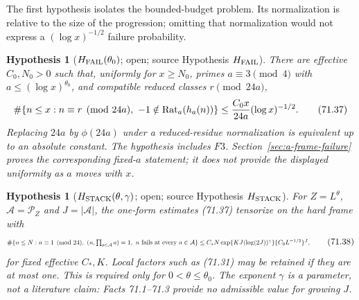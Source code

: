 \documentclass[10pt,reqno]{amsart}
\newtheorem{hypothesis}[theorem]{Hypothesis}
\theoremstyle{definition}
\newcommand{\1}{\mathbf 1}
\begin{document}
The first hypothesis isolates the bounded-budget problem.  Its normalization
is relative to the size of the progression; omitting that normalization
would not express a $(\log x)^{-1/2}$ failure probability.

\begin{hypothesis}[$H_{\rm FAIL}(\theta_0)$; open; source Hypothesis $H_{\rm FAIL}$]\label{hyp:H-FAIL}  There are effective
$C_0,N_0>0$ such that, uniformly for $x\geq N_0$, primes
$a\equiv3\pmod4$ with $a\leq(\log x)^{\theta_0}$, and compatible
reduced classes $r\pmod {24a}$,
\begin{equation}
 \#\{n\leq x:n\equiv r\pmod {24a},\
       -1\notin\operatorname {Rat}_a(h_a(n))\}
 \leq {C_0x\over24a}(\log x)^{-1/2}.                     \tag{71.37}
\end{equation}
Replacing $24a$ by $\phi(24a)$ under a reduced-residue
normalization is equivalent up to an absolute constant.  The hypothesis includes $F3$.  Section~\ref{sec:a-frame-failure} proves the corresponding
fixed-$a$ statement; it does not provide the displayed uniformity as $a$
moves with $x$.

\end{hypothesis}
\begin{hypothesis}[$H_{\rm STACK}(\theta,\gamma)$; open; source Hypothesis $H_{\rm STACK}$]\label{hyp:H-STACK}  For
$Z=L^\theta$, $\mathcal A=\mathcal P_Z$ and
$J=|\mathcal A|$, the one-form estimates (71.37) tensorize on the hard
frame with
\begin{equation}
\resizebox{\textwidth}{!}{$
 \#\{n\leq N:n\equiv1\pmod {24},\ (n,\prod_{a\in\mathcal A}a)=1,\
               n\hbox{ fails at every }a\in\mathcal A\}
 \leq C_*N\exp\{KJ(\log(2J))^\gamma\}
                 \{C_0L^{-1/2}\}^{J},
$}                                                          \tag{71.38}
\end{equation}
for fixed effective $C_*,K$.  Local factors such as (71.31) may be
retained if they are at most one.  This is required only for
$0<\theta\leq\theta_0$.  The exponent $\gamma$ is a parameter, not a
literature claim: Facts 71.1--71.3 provide no admissible value for growing
$J$.

\end{hypothesis}
\end{document}
